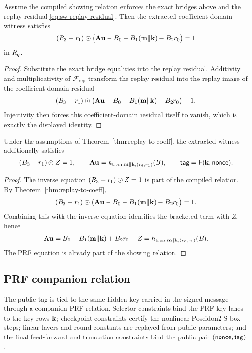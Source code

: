 \begin{theorem}
\label{thm:replay-to-coeff}
Assume the compiled showing relation enforces the exact bridges above and the replay residual
\eqref{eq:sw-replay-residual}.  Then the extracted coefficient-domain witness satisfies
\[
  (B_3-r_1)\odot\bigl(\mathbf{A}\mathbf{u}-B_0-B_1(\mathbf{m}\Vert\mathbf{k})-B_2r_0\bigr)=1
\]
in $R_q$.
\end{theorem}

\begin{proof}
Substitute the exact bridge equalities into the replay residual.  Additivity and multiplicativity of
$\mathcal F_{\mathrm{rep}}$ transform the replay residual into the replay image of the coefficient-domain residual
\[
  (B_3-r_1)\odot\bigl(\mathbf{A}\mathbf{u}-B_0-B_1(\mathbf{m}\Vert\mathbf{k})-B_2r_0\bigr)-1.
\]
Injectivity then forces this coefficient-domain residual itself to vanish, which is exactly the displayed
identity.
\end{proof}

\begin{corollary}\label{cor:showing-to-abstract}
Under the assumptions of Theorem~\ref{thm:replay-to-coeff}, the extracted witness additionally satisfies
\[
  (B_3-r_1)\odot Z=1,
  \qquad
  \mathbf{A}\mathbf{u}=h_{\mathrm{tran},\mathbf{m}\Vert\mathbf{k},(r_0,r_1)}(B),
  \qquad
  \mathsf{tag}=\mathsf{F}(\mathbf{k},\mathsf{nonce}).
\]
\end{corollary}

\begin{proof}
The inverse equation $(B_3-r_1)\odot Z=1$ is part of the compiled relation.  By
Theorem~\ref{thm:replay-to-coeff},
\[
  (B_3-r_1)\odot\bigl(\mathbf{A}\mathbf{u}-B_0-B_1(\mathbf{m}\Vert\mathbf{k})-B_2r_0\bigr)=1.
\]
Combining this with the inverse equation identifies the bracketed term with $Z$, hence
\[
  \mathbf{A}\mathbf{u}=B_0+B_1(\mathbf{m}\Vert\mathbf{k})+B_2r_0+Z
  =h_{\mathrm{tran},\mathbf{m}\Vert\mathbf{k},(r_0,r_1)}(B).
\]
The PRF equation is already part of the showing relation.
\end{proof}

\subsection{PRF companion relation}
\label{subsec:prf-checkpointed}
The public tag is tied to the same hidden key carried in the signed message through a companion PRF
relation.  Selector constraints bind the PRF key lanes to the key rows $\mathbf{k}$; checkpoint constraints certify the
nonlinear Poseidon2 S-box steps; linear layers and round constants are replayed from public parameters; and the
final feed-forward and truncation constraints bind the public pair $(\mathsf{nonce},\mathsf{tag})$.

